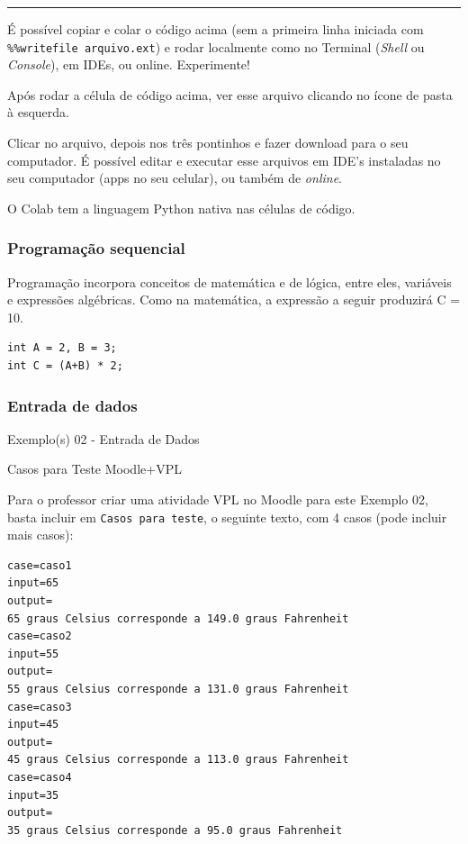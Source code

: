 \documentclass[12pt,a4paper]{article}
\begin{document}
    \begin{center}\rule{0.5\linewidth}{0.5pt}\end{center}

É possível copiar e colar o código acima (sem a primeira linha iniciada
com \texttt{\%\%writefile\ arquivo.ext}) e rodar localmente como no
Terminal (\emph{Shell} ou \emph{Console}), em IDEs, ou online.
Experimente!

    Após rodar a célula de código acima, ver esse arquivo clicando no ícone
de pasta à esquerda.

    Clicar no arquivo, depois nos três pontinhos e fazer download para o seu
computador. É possível editar e executar esse arquivos em IDE's
instaladas no seu computador (apps no seu celular), ou também de
\emph{online}.

    O Colab tem a linguagem Python nativa nas células de código.

    \hypertarget{programauxe7uxe3o-sequencial}{%
\subsubsection{Programação
sequencial}\label{programauxe7uxe3o-sequencial}}

    Programação incorpora conceitos de matemática e de lógica, entre eles,
variáveis e expressões algébricas. Como na matemática, a expressão a
seguir produzirá C = 10.

    \begin{verbatim}
int A = 2, B = 3;
int C = (A+B) * 2;
\end{verbatim}

    \hypertarget{entrada-de-dados}{%
\subsubsection{Entrada de dados}\label{entrada-de-dados}}

    Exemplo(s) 02 - Entrada de Dados

    Casos para Teste Moodle+VPL

Para o professor criar uma atividade VPL no Moodle para este Exemplo 02,
basta incluir em \texttt{Casos\ para\ teste}, o seguinte texto, com 4
casos (pode incluir mais casos):

\begin{verbatim}
case=caso1
input=65
output= 
65 graus Celsius corresponde a 149.0 graus Fahrenheit
case=caso2
input=55
output= 
55 graus Celsius corresponde a 131.0 graus Fahrenheit
case=caso3
input=45
output= 
45 graus Celsius corresponde a 113.0 graus Fahrenheit
case=caso4
input=35
output= 
35 graus Celsius corresponde a 95.0 graus Fahrenheit
\end{verbatim}
\end{document}
